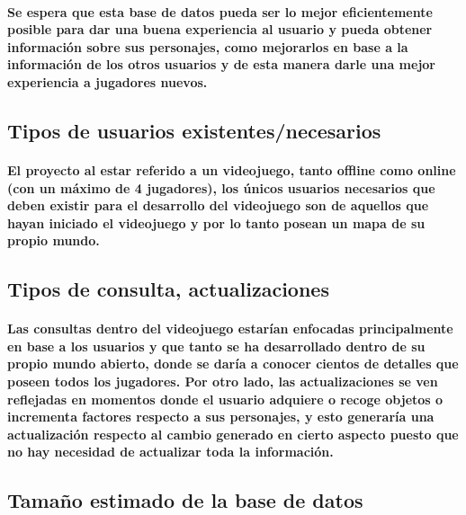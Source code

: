 \documentclass{report}
\begin{document}
\paragraph{Se espera que esta base de datos pueda ser lo mejor eficientemente posible para dar una buena experiencia al usuario y pueda obtener información sobre sus personajes, como mejorarlos en base a la información de los otros usuarios y de esta manera darle una mejor experiencia a jugadores nuevos.}

\subsection{Tipos de usuarios existentes/necesarios}
\paragraph{El proyecto al estar referido a un videojuego, tanto offline como online (con un máximo de 4 jugadores), los únicos usuarios necesarios que deben existir para el desarrollo del videojuego son de aquellos que hayan iniciado el videojuego y por lo tanto posean un mapa de su propio mundo.}

\subsection{Tipos de consulta, actualizaciones}
\paragraph{Las consultas dentro del videojuego estarían enfocadas principalmente en base a los usuarios y que tanto se ha desarrollado dentro de su propio mundo abierto, donde se daría a conocer cientos de detalles que poseen todos los jugadores. Por otro lado, las actualizaciones se ven reflejadas en momentos donde el usuario adquiere o recoge objetos o incrementa factores respecto a sus personajes, y esto generaría una actualización respecto al cambio generado en cierto aspecto puesto que no hay necesidad de actualizar toda la información.}

\subsection{Tamaño estimado de la base de datos}
\end{document}
